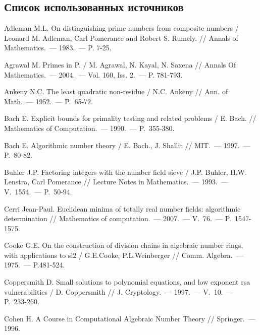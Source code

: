 \renewcommand{\bibname}{БИБЛИОГРАФИЧЕСКИЙ СПИСОК}

\begin{thebibliography}{99}
\section*{Список использованных источников}
\vspace{-12pt}

    Adleman M.L. On distinguishing prime numbers from composite numbers / Leonard M. Adleman, Carl Pomerance and Robert S. Rumely. // Annals of Mathematics.~--- 1983.~--- P. 7-25.

    Agrawal M. Primes in P. / M. Agrawal, N. Kayal, N. Saxena // Annals Of Mathematics.~--- 2004.~--- Vol. 160, Iss. 2.~--- P. 781-793.

    Ankeny N.C. The least quadratic non-residue / N.C. Ankeny // Ann. of Math.~--- 1952.~--- P.~65-72.

    Bach E. Explicit bounds for primality testing and related problems / E. Bach. // Mathematics of Computation.~--- 1990.~--- P.~355-380.

    Bach E. Algorithmic number theory / E. Bach., J. Shallit // MIT.~--- 1997.~--- P.~80-82.

    Buhler J.P. Factoring integers with the number field sieve / J.P. Buhler, H.W. Lenstra, Carl Pomerance // Lecture Notes in Mathematics.~--- 1993.~--- V.~1554.~--- P.~50-94.

    Cerri Jean-Paul. Euclidean minima of totally real number fields: algorithmic determination // Mathematics of computation.~--- 2007.~--- V.~76.~--- {P.}~1547-1575.

    Cooke G.E. On the construction of division chains in algebraic number rings, with applications to sl2 / G.E.Cooke, P.L.Weinberger // Comm. Algebra.~--- 1975.~--- P.481-524.

    Coppersmith D. Small solutions to polynomial equations, and low exponent rsa vulnerabilities / D. Coppersmith // J. Cryptology.~--- 1997.~--- V.~10.~--- P.~233-260.

    Cohen H. A Course in Computational Algebraic Number Theory // Springer.~--- 1996.


\end{thebibliography}
